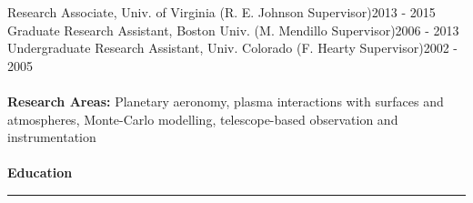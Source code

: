 \documentclass[12pt]{report}
\begin{document}
\noindent Research Associate, Univ. of Virginia (R. E. Johnson Supervisor)\hfill 2013 - 2015\\
\noindent Graduate Research Assistant, Boston Univ. (M. Mendillo Supervisor)\hfill 2006 - 2013\\
\noindent Undergraduate Research Assistant, Univ. Colorado (F. Hearty Supervisor)\hfill 2002 - 2005\\
\vspace{1 mm}\\
\textbf{Research Areas:} Planetary aeronomy, plasma interactions with surfaces and atmospheres, Monte-Carlo modelling, telescope-based observation and instrumentation\\
\vspace{2 mm}\\
\bf{Education}\rm\\
\rule{\textwidth}{1pt}\\
\end{document}
